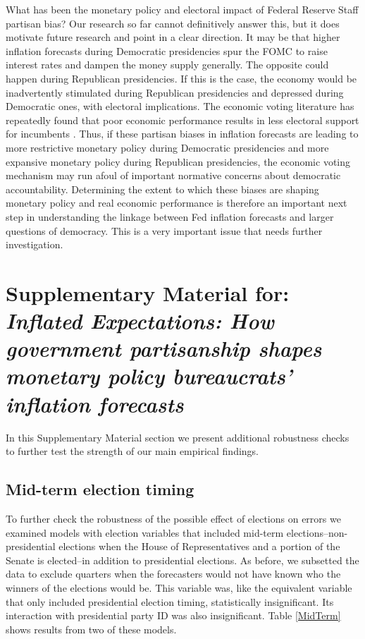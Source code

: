 \documentclass[a4paper]{article}
\begin{document}
What has been the monetary policy and electoral impact of Federal Reserve Staff partisan bias? Our research so far cannot definitively answer this, but it does motivate future research and point in a clear direction. It may be that higher inflation forecasts during Democratic presidencies spur the FOMC to raise interest rates and dampen the money supply generally. The opposite could happen during Republican presidencies. If this is the case, the economy would be inadvertently stimulated during Republican presidencies and depressed during Democratic ones, with electoral implications. The economic voting literature has repeatedly found that poor economic performance results in less electoral support for incumbents \citep[e.g.][]{Alvarez1998, Bloom1975, LewisBeck1988, Powell1993}. Thus, if these partisan biases in inflation forecasts are leading to more restrictive monetary policy during Democratic presidencies and more expansive monetary policy during Republican presidencies, the economic voting mechanism may run afoul of important normative concerns about democratic accountability. Determining the extent to which these biases are shaping monetary policy and real economic performance is therefore an important next step in understanding the linkage between Fed inflation forecasts and larger questions of democracy. This is a very important issue that needs further investigation.


\clearpage





\clearpage

\section*{Supplementary Material for:\\ \emph{Inflated Expectations: How government partisanship shapes monetary policy bureaucrats' inflation forecasts}}

In this Supplementary Material section we present additional robustness checks to further test the strength of our main empirical findings.

\subsection*{Mid-term election timing}

To further check the robustness of the possible effect of elections on errors we examined models with election variables that included mid-term elections--non-presidential elections when the House of Representatives and a portion of the Senate is elected--in addition to presidential elections. As before, we subsetted the data to exclude quarters when the forecasters would not have known who the winners of the elections would be. This variable was, like the equivalent variable that only included presidential election timing, statistically insignificant. Its interaction with presidential party ID was also insignificant. Table \ref{MidTerm} shows results from two of these models.
\end{document}
